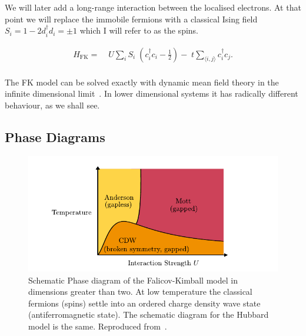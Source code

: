 We will later add a long-range interaction between the localised electrons. At that point we will replace the immobile fermions with a classical Ising field \(S_i = 1 - 2d^\dagger_id_i = \pm1\) which I will refer to as the spins.

\[\begin{aligned}
H_{\mathrm{FK}} = & \;U \sum_{i} S_i\;(c^\dagger_{i}c_{i} - \tfrac{1}{2}) -\;t \sum_{\langle i,j\rangle} c^\dagger_{i}c_{j}.\\ 
\end{aligned}\]

The FK model can be solved exactly with dynamic mean field theory in the infinite dimensional limit~\autocite{antipovCriticalExponentsStrongly2014,ribicNonlocalCorrelationsSpectral2016,freericksExactDynamicalMeanfield2003,herrmannNonequilibriumDynamicalCluster2016}. In lower dimensional systems it has radically different behaviour, as we shall see.

\hypertarget{phase-diagrams}{%
\subsection{Phase Diagrams}\label{phase-diagrams}}

\hypertarget{fig:fk_phase_diagram}{%
\begin{figure}
\centering
\includegraphics[width=1\textwidth,height=\textheight]{figure_code/background_chapter/fk_phase_diagram}
\caption[{Falicov-Kimball Temperature-Interaction Phase Diagrams}]{Schematic Phase diagram of the Falicov-Kimball model in dimensions greater than two. At low temperature the classical fermions (spins) settle into an ordered charge density wave state (antiferromagnetic state). The schematic diagram for the Hubbard model is the same. Reproduced from~\autocite{antipovInteractionTunedAndersonMott2016,antipovCriticalExponentsStrongly2014}.}
\label{fig:fk_phase_diagram}
\end{figure}
}

